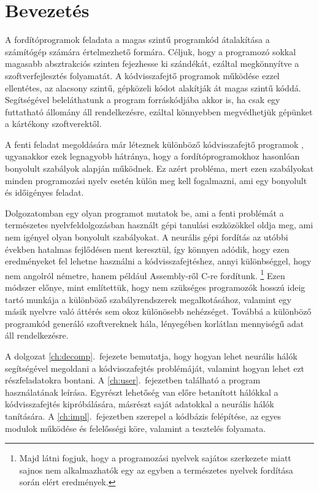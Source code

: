 \chapter{Bevezetés}
\label{ch:intro}

A fordítóprogramok feladata a magas szintű programkód átalakítása a számítógép számára értelmezhető formára. Céljuk, 
hogy a programozó sokkal magasabb absztrakciós szinten fejezhesse ki szándékát, ezáltal megkönnyítve a 
szoftverfejlesztés folyamatát. A kódvisszafejtő programok működése ezzel ellentétes, az alacsony szintű, gépközeli 
kódot alakítják át magas szintű kóddá. Segítségével beleláthatunk a program forráskódjába akkor is, ha csak egy 
futtatható állomány áll rendelkezésre, ezáltal könnyebben megvédhetjük gépünket a kártékony szoftverektől.

A fenti feladat megoldására már léteznek különböző kódvisszafejtő programok \cite{ghidra, binaryninja},
ugyanakkor ezek legnagyobb hátránya, hogy a fordítóprogramokhoz hasonlóan bonyolult szabályok
alapján működnek. Ez azért probléma, mert ezen szabályokat minden programozási nyelv esetén
külön meg kell fogalmazni, ami egy bonyolult és időigényes feladat.

Dolgozatomban egy olyan programot mutatok be, ami a fenti problémát a természetes
nyelvfeldolgozásban használt gépi tanulási eszközökkel oldja meg, ami nem igényel olyan bonyolult szabályokat. A neurális gépi fordítás
az utóbbi években hatalmas fejlődésen ment keresztül\cite{bert}, így könnyen adódik, hogy ezen
eredményeket fel lehetne használni a kódvisszafejtéshez, annyi különbséggel, hogy nem
angolról németre, hanem például Assembly-ről C-re fordítunk.
\footnote{Majd látni fogjuk, hogy a programozási nyelvek sajátos szerkezete miatt sajnos
nem alkalmazhatók egy az egyben a természetes nyelvek fordítása során elért eredmények.}
Ezen módszer előnye, mint említettük, hogy nem szükséges programozók hosszú ideig tartó munkája a különböző
szabályrendszerek megalkotásához, valamint egy másik nyelvre való áttérés sem okoz
különösebb nehézséget. Továbbá a különböző programkód generáló szoftvereknek
hála, lényegében korlátlan mennyiségű adat áll rendelkezésre.

A dolgozat \ref{ch:decomp}.~fejezete bemutatja, hogy hogyan lehet neurális hálók segítségével megoldani
a kódvisszafejtés problémáját, valamint hogyan lehet ezt részfeladatokra bontani.
A \ref{ch:user}.~fejezetben található a program használatának leírása. Egyrészt lehetőség van
előre betanított hálókkal a kódvisszafejtés kipróbálására, másrészt saját adatokkal a neurális
hálók tanítására.
A \ref{ch:impl}.~fejezetben szerepel a kódbázis felépítése, az egyes modulok működése és felelősségi köre,
valamint a tesztelés folyamata.
